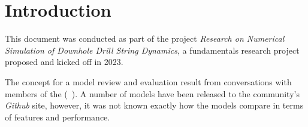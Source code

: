 \chapter{Introduction}
This document was conducted as part of the project \emph{Research on Numerical Simulation of Downhole Drill String Dynamics}, a fundamentals research project proposed and kicked off in 2023.

The concept for a model review and evaluation result from conversations with members of the \osdc{} (~\cite{ref:pastusek2019a}).  A number of models have been released to the community's \emph{Github} site, however, it was not known exactly how the models compare in terms of features and performance.


